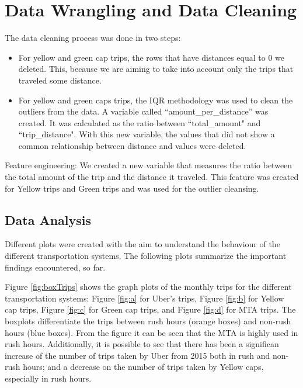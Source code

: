 \section{Data Wrangling and Data Cleaning}
\label{subsec:dataCl}


The data cleaning process was done in two steps:

\begin{itemize}
\item For yellow and green cap trips, the rows that have distances equal to $0$ we deleted. This, because we are aiming to take into account only the trips that traveled some distance.
\item For yellow and green caps trips, the IQR methodology was used to clean the outliers from the data. A variable called ``amount\_per\_distance'' was created. It was calculated as the ratio between ``total\_amount" and ``trip\_distance". With this new variable, the values that did not show a common relationship between distance and values were deleted.
\end{itemize}

Feature engineering:
We created a new variable that measures the ratio between the total amount of the trip and the distance it traveled. This feature was created for Yellow trips and Green trips and was used for the outlier cleansing.

\subsection{Data Analysis}

Different plots were created with the aim to understand the behaviour of the different transportation systems. The following plots summarize the important findings encountered, so far.

Figure \ref{fig:boxTrips} shows the graph plots of the monthly trips for the different transportation systems: Figure \ref{fig:a} for Uber's trips, Figure \ref{fig:b} for Yellow cap trips, Figure \ref{fig:c} for Green cap trips, and Figure \ref{fig:d} for MTA trips. The boxplots differentiate the trips between rush hours (orange boxes) and non-rush hours (blue boxes). From the figure it can be seen that the MTA is highly used in rush hours. Additionally, it is possible to see that there has been a significan increase of the number of trips taken by Uber from 2015 both in rush and non-rush hours; and a decrease on the number of trips taken by Yellow caps, especially in rush hours. 

